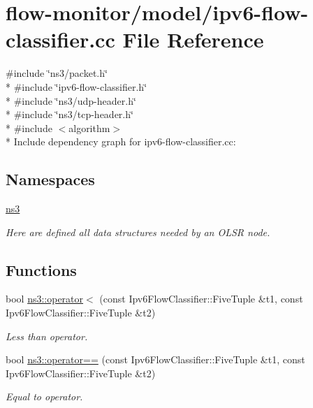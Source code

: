 \hypertarget{ipv6-flow-classifier_8cc}{}\section{flow-\/monitor/model/ipv6-\/flow-\/classifier.cc File Reference}
\label{ipv6-flow-classifier_8cc}
{\ttfamily \#include \char`\"{}ns3/packet.\+h\char`\"{}}\\*
{\ttfamily \#include \char`\"{}ipv6-\/flow-\/classifier.\+h\char`\"{}}\\*
{\ttfamily \#include \char`\"{}ns3/udp-\/header.\+h\char`\"{}}\\*
{\ttfamily \#include \char`\"{}ns3/tcp-\/header.\+h\char`\"{}}\\*
{\ttfamily \#include $<$algorithm$>$}\\*
Include dependency graph for ipv6-\/flow-\/classifier.cc\+:
\subsection*{Namespaces}
\begin{DoxyCompactItemize}
\item 
 \hyperlink{namespacens3}{ns3}
\begin{DoxyCompactList}\small\item\em Here are defined all data structures needed by an O\+L\+SR node. \end{DoxyCompactList}\end{DoxyCompactItemize}
\subsection*{Functions}
\begin{DoxyCompactItemize}
\item 
bool \hyperlink{namespacens3_ad46b985f1c7486de266c6405f9e4c0e1}{ns3\+::operator$<$} (const Ipv6\+Flow\+Classifier\+::\+Five\+Tuple \&t1, const Ipv6\+Flow\+Classifier\+::\+Five\+Tuple \&t2)
\begin{DoxyCompactList}\small\item\em Less than operator. \end{DoxyCompactList}\item 
bool \hyperlink{namespacens3_a159404cb0d5434816143bcc0319c1c32}{ns3\+::operator==} (const Ipv6\+Flow\+Classifier\+::\+Five\+Tuple \&t1, const Ipv6\+Flow\+Classifier\+::\+Five\+Tuple \&t2)
\begin{DoxyCompactList}\small\item\em Equal to operator. \end{DoxyCompactList}\end{DoxyCompactItemize}
